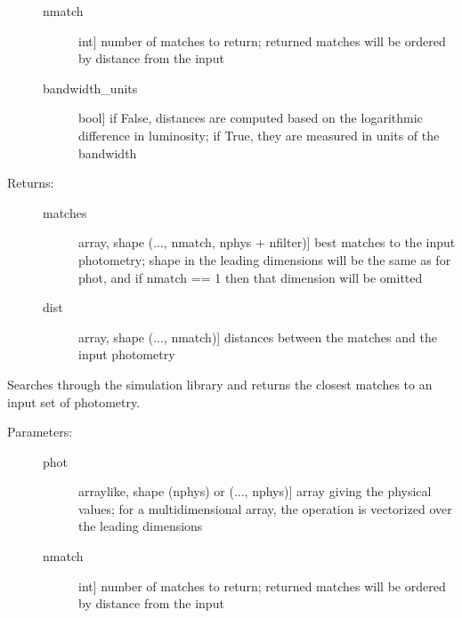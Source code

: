\documentclass[letterpaper,10pt,english]{sphinxmanual}
\begin{document}
\begin{fulllineitems}
\begin{fulllineitems}
\begin{description}
\begin{description}
\item[{nmatch}] \leavevmode{[}int{]}
number of matches to return; returned matches will be
ordered by distance from the input

\item[{bandwidth\_units}] \leavevmode{[}bool{]}
if False, distances are computed based on the
logarithmic difference in luminosity; if True, they are
measured in units of the bandwidth

\end{description}

\item[{Returns:}] \leavevmode\begin{description}
\item[{matches}] \leavevmode{[}array, shape (..., nmatch, nphys + nfilter){]}
best matches to the input photometry; shape in the
leading dimensions will be the same as for phot, and if
nmatch == 1 then that dimension will be omitted

\item[{dist}] \leavevmode{[}array, shape (..., nmatch){]}
distances between the matches and the input photometry

\end{description}

\end{description}

\end{fulllineitems}


\begin{fulllineitems}
\label{bayesphot:slugpy.bayesphot.bp.bp.bestmatch_phys}
Searches through the simulation library and returns the closest
matches to an input set of photometry.
\begin{description}
\item[{Parameters:}] \leavevmode\begin{description}
\item[{phot}] \leavevmode{[}arraylike, shape (nphys) or (..., nphys){]}
array giving the physical values; for a
multidimensional array, the operation is vectorized over
the leading dimensions

\item[{nmatch}] \leavevmode{[}int{]}
number of matches to return; returned matches will be
ordered by distance from the input


\end{description}
\end{description}
\end{fulllineitems}
\end{fulllineitems}
\end{document}

